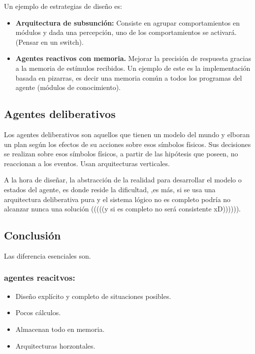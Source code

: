 \documentclass[a4paper]{article}
\begin{document}
Un ejemplo de estrategias de diseño es: 

\begin{itemize}
  \item  \textbf{Arquitectura de subsunción:} Consiste en agrupar comportamientos en módulos y dada una percepción, uno de los comportamientos se activará. (Pensar en un switch).
  \item  \textbf{Agentes reactivos con memoria.} Mejorar la precisión de respuesta gracias a la memoria de estímulos recibidos. 
  Un ejemplo de este es la implementación basada en pizarras, es decir una memoria común a todos los programas del agente (módulos de conocimiento).
\end{itemize}

\subsection{Agentes deliberativos}

Los agentes deliberativos son aquellos que tienen un modelo del mundo y elboran un plan según los efectos de
su acciones sobre esos símbolos físicos. Sus decisiones se realizan sobre esos símbolos físicos, a partir de las hipótesis que poseen,
no reaccionan a los eventos. 
Usan arquitecturas verticales.

A la hora de diseñar, la abstracción de la realidad para desarrollar el modelo  o estados del agente, es donde reside la dificultad, 
,es más, si se usa una arquitectura deliberativa pura y el sistema lógico no es completo podría no alcanzar nunca una solución (((((y si es completo no será consistente xD)))))). 



\subsection*{Conclusión}
Las diferencia esenciales son. 

\subsubsection*{agentes reacitvos: }

\begin{itemize}
  \item Diseño explícito y completo de situaciones posibles.
  \item Pocos cálculos.
  \item Almacenan todo en memoria.
  \item Arquitecturas horzontales.
\end{itemize}
\end{document}
